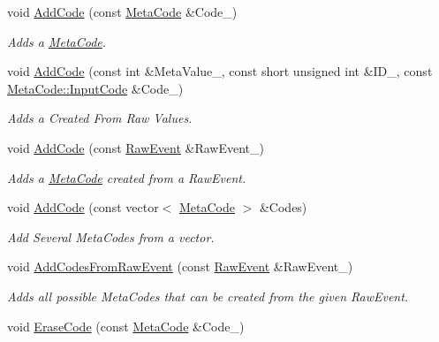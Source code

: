 \begin{DoxyCompactItemize}
void \hyperlink{classphys_1_1EventUserInput_a648f820aea2b6bca23eaa3c1e1f54181}{AddCode} (const \hyperlink{classphys_1_1MetaCode}{MetaCode} \&Code\_\-)
\begin{DoxyCompactList}\small\item\em Adds a \hyperlink{classphys_1_1MetaCode}{MetaCode}. \item\end{DoxyCompactList}\item 
void \hyperlink{classphys_1_1EventUserInput_ac9d4d8372fad7d91a5508d9e612a10e9}{AddCode} (const int \&MetaValue\_\-, const short unsigned int \&ID\_\-, const \hyperlink{classphys_1_1MetaCode_a3e501cbb5bf0f6f1fdb7211465bda8d8}{MetaCode::InputCode} \&Code\_\-)
\begin{DoxyCompactList}\small\item\em Adds a Created From Raw Values. \item\end{DoxyCompactList}\item 
void \hyperlink{classphys_1_1EventUserInput_a9b0787db5ed6e326c4932fd83798e118}{AddCode} (const \hyperlink{namespacephys_a8126d26e4507e66d09876988bb941fd4}{RawEvent} \&RawEvent\_\-)
\begin{DoxyCompactList}\small\item\em Adds a \hyperlink{classphys_1_1MetaCode}{MetaCode} created from a RawEvent. \item\end{DoxyCompactList}\item 
void \hyperlink{classphys_1_1EventUserInput_a6b6071496574fbb719ba4a5d97e74b52}{AddCode} (const vector$<$ \hyperlink{classphys_1_1MetaCode}{MetaCode} $>$ \&Codes)
\begin{DoxyCompactList}\small\item\em Add Several MetaCodes from a vector. \item\end{DoxyCompactList}\item 
void \hyperlink{classphys_1_1EventUserInput_a26a39a23deab9e54c140cc0a1cbbe6a9}{AddCodesFromRawEvent} (const \hyperlink{namespacephys_a8126d26e4507e66d09876988bb941fd4}{RawEvent} \&RawEvent\_\-)
\begin{DoxyCompactList}\small\item\em Adds all possible MetaCodes that can be created from the given RawEvent. \item\end{DoxyCompactList}\item 
void \hyperlink{classphys_1_1EventUserInput_a34c05a76a790435799441da75a83fa9c}{EraseCode} (const \hyperlink{classphys_1_1MetaCode}{MetaCode} \&Code\_\-)

\end{DoxyCompactItemize}
